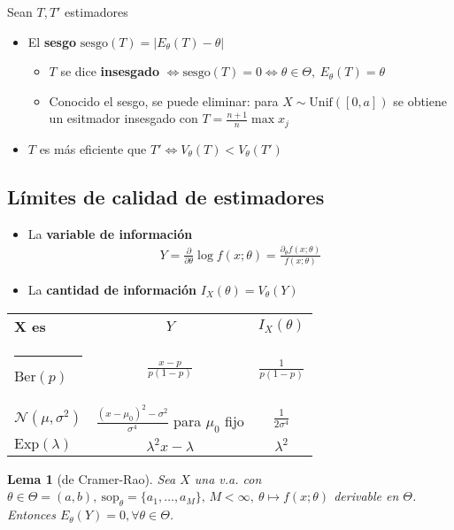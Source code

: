 \documentclass[a4paper,twocolumn]{extarticle}
\makeatletter
\newtheorem*{lem}{Lema}
\theoremstyle{remark}
\newcommand{\normal}{\mathcal{N}}
\newcommand{\thickhline}{%
	\noalign {\ifnum 0=`}\fi \hrule height 1pt
	\futurelet \reserved@a \@xhline
}
\makeatother
\begin{document}
Sean $T, T'$ estimadores
\begin{itemize}
	\item El \textbf{sesgo} $\text{sesgo}(T) = |E_\theta(T) - \theta|$
	\begin{itemize}
		\item $T$ se dice \textbf{insesgado} $\iff \text{sesgo}(T) = 0 \iff \theta \in \Theta,\ E_\theta(T) = \theta$
		\item Conocido el sesgo, se puede eliminar: para $X \sim \text{Unif}([0,a])$ se obtiene un esitmador insesgado con $T = \frac{n+1}{n}\max x_j$
	\end{itemize}
	\item $T$ es más eficiente que $T' \iff V_\theta(T) < V_\theta(T')$
\end{itemize}

\subsection{Límites de calidad de estimadores}

\begin{itemize}
	\item La \textbf{variable de información}
	\begin{align*}
		Y = \frac{\partial}{\partial \theta} \log f(x; \theta) = \frac{\partial_\theta f(x; \theta)}{f(x; \theta)}
	\end{align*}
	\item La \textbf{cantidad de información} $I_X(\theta) = V_\theta(Y)$
\end{itemize}

\begin{table}[h]
	\centering
	{\renewcommand{\arraystretch}{1.4}
		\begin{tabular}{|l|c|c|}
			\hline
			\textbf{X es} & $Y$ & $I_X(\theta)$ \\\thickhline
			$\text{Ber}(p)$ & $\frac{x-p}{p(1-p)}$ & $\frac{1}{p(1-p)}$ \\\hline
			$\normal(\mu, \sigma^2)$ & $\frac{(x-\mu_0)^2 - \sigma^2}{\sigma^4}$ para $\mu_0$ fijo & $\frac{1}{2\sigma^4}$ \\\hline
			$\text{Exp}(\lambda)$ & $\lambda^2x - \lambda$ & $\lambda^2$ \\\hline
	\end{tabular}}
\end{table}

\begin{lem}
	[de Cramer-Rao]
	Sea $X$ una v.a. con $\theta \in \Theta = (a,b),\ \text{sop}_\theta = \{a_1, \dots, a_M\},\, M < \infty,\ \theta \mapsto f(x; \theta)$ derivable en $\Theta$. Entonces $E_\theta(Y) = 0, \forall \theta \in \Theta$.
\end{lem}
\end{document}
